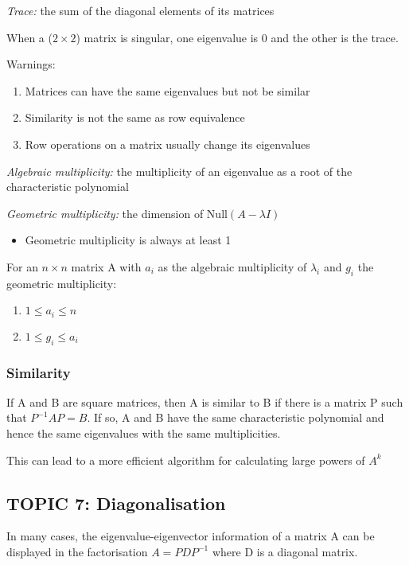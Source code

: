\documentclass[12pt]{article} %
\begin{document}
\emph{Trace:} the sum of the diagonal elements of its matrices

When a ($2 \times 2$) matrix is singular, one eigenvalue is 0 and the other is the trace.

Warnings:
\begin{enumerate}
	\item Matrices can have the same eigenvalues but not be similar
	\item Similarity is not the same as row equivalence
	\item Row operations on a matrix usually change its eigenvalues
\end{enumerate}

\emph{Algebraic multiplicity:} the multiplicity of an eigenvalue as a root of the characteristic polynomial

\emph{Geometric multiplicity:} the dimension of $\text{Null}(A-\lambda I)$
\begin{itemize}
	\item Geometric multiplicity is always at least 1
\end{itemize}

For an $n \times n$ matrix A with $a_i$ as the algebraic multiplicity of $\lambda_i$ and $g_i$ the geometric multiplicity:
\begin{enumerate}
	\item $1 \leq a_i \leq n$
	\item $1 \leq g_i \leq a_i$
\end{enumerate}

\subsubsection{Similarity}
If A and B are square matrices, then A is similar to B if there is a matrix P such that $P^{-1} AP = B$. If so, A and B have the same characteristic polynomial and hence the same eigenvalues with the same multiplicities.

This can lead to a more efficient algorithm for calculating large powers of $A^k$

\subsection{TOPIC 7: Diagonalisation}
In many cases, the eigenvalue-eigenvector information of a matrix A can be displayed in the factorisation $A = PDP^{-1}$ where D is a diagonal matrix.
\end{document}
